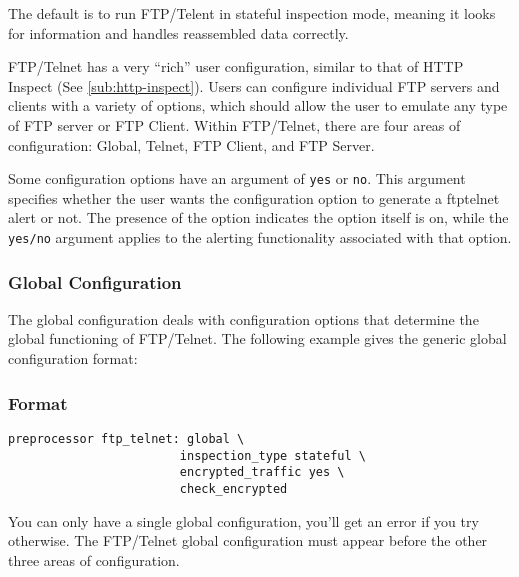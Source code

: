 \documentclass[english]{report}
\newenvironment{note}{
\samepage
    \vspace{10pt}{\textsf{
        {\hspace{7pt}\Huge{$\triangle$\hspace{-12.5pt}{\Large{$^!$}}}}\hspace{5pt}
        {\Large{NOTE}}
    }
    }
   \begin{center}
    \par\vspace{-17pt}

    \begin{lrbox}{\savepar}
    \begin{minipage}[r]{6in}
}
{
    \end{minipage}
    \end{lrbox}
    \fbox{
        \usebox{
            \savepar
	}
    }
    \par\vskip10pt
    \end{center}
}
\newenvironment{note}{
        \begin{rawhtml}
        <p><table border="1"><tr><td><b>
        Note:&nbsp;&nbsp;</b>
        \end{rawhtml}
}{
        \begin{rawhtml}
        </b></td></tr></table></p>
        \end{rawhtml}
}
\begin{document}
The default is to run FTP/Telent in stateful inspection mode, meaning
it looks for information and handles reassembled data correctly.

FTP/Telnet has a very ``rich'' user configuration, similar to that of
HTTP Inspect (See \ref{sub:http-inspect}).  Users can configure
individual FTP servers and clients with a variety of options, which
should allow the user to emulate any type of FTP server or FTP Client.
Within FTP/Telnet, there are four areas of configuration: Global,
Telnet, FTP Client, and FTP Server.

\begin{note}
Some configuration options have an argument of \texttt{yes} or \texttt{no}.
This argument specifies whether the user wants the configuration option to
generate a ftptelnet alert or not.  The presence of the option indicates
the option itself is on, while the \texttt{yes/no} argument applies to the
alerting functionality associated with that option.
\end{note}

\subsubsection{Global Configuration}

The global configuration deals with configuration options that determine the
global functioning of FTP/Telnet.  The following example gives the generic
global configuration format:

\subsubsection{Format}
\begin{verbatim}
preprocessor ftp_telnet: global \
                        inspection_type stateful \
                        encrypted_traffic yes \
                        check_encrypted
\end{verbatim}

You can only have a single global configuration, you'll get an error if
you try otherwise.  The FTP/Telnet global configuration must appear
before the other three areas of configuration.
\end{document}
